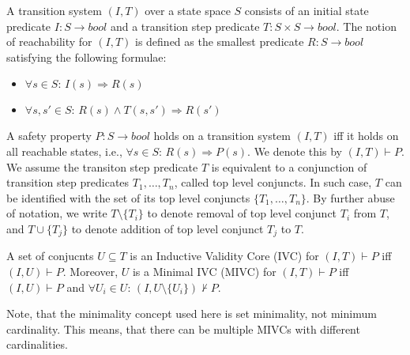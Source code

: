 A transition system $(I,T)$ over a state space $S$ consists of an initial state predicate $I : S \rightarrow bool$ and a transition step predicate $T : S \times S \rightarrow bool$. The notion of reachability for $(I, T)$ is defined as the smallest predicate $R : S \rightarrow bool$ satisfying the following formulae:

\begin{itemize}
	\item[] $\forall s \in S: \, I(s) \Rightarrow R(s)$
	\item[] $\forall s, s' \in S: \, R(s) \wedge T(s, s') \Rightarrow R(s')$
\end{itemize}

A safety property $P: S \rightarrow bool$ holds on a transition system $(I, T)$ iff it holds on all reachable states, i.e., $\forall s \in S: \, R(s) \Rightarrow P(s)$. We denote this by $(I, T) \vdash P$. We assume
the transiton step predicate $T$ is equivalent to   a conjunction of transition step predicates $T_1, \ldots, T_n$,  called top level conjuncts. 
In such case, $T$ can be identified with the set of its top level conjuncts $\{ T_1, \ldots, T_n\}$. By further abuse of notation, we write $T \setminus \{ T_i \}$ to denote removal of top level conjunct $T_i$ from $T$, and $T \cup \{ T_j\}$ to denote addition of top level conjunct $T_j$ to $T$. 


\begin{definition}
A set of conjucnts $U \subseteq T$ is an Inductive Validity Core (IVC) for $(I, T) \vdash P$ iff $(I, U) \vdash P$. Moreover, $U$ is a Minimal IVC (MIVC) for $(I, T) \vdash P$ iff $(I, U) \vdash P$ and $\forall U_i \in U: \, (I, U \setminus \{ U_i\}) \nvdash P$.
\end{definition}

Note, that the minimality concept used here is set minimality, not minimum cardinality. This means, that there can be multiple MIVCs with different cardinalities. 





